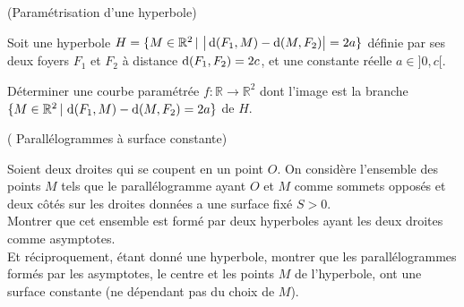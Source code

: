 \documentclass[a4paper,12pt,reqno]{amsart}
\begin{document}
\begin{exo} (Paramétrisation d'une hyperbole)


  Soit une hyperbole $H = \{ M \in \mathbb{R}^{2} \,|\ \big|\operatorname{d}(F_{1},M)-\operatorname{d}(M,F_{2})\big|=2a\}$ définie par ses deux foyers $F_{1}$ et $F_{2}$ à distance $\operatorname{d}(F_{1},F_{2})=2c$, et une constante réelle $a \in ]0,c[$.

  Déterminer une courbe paramétrée $f:\mathbb{R}\to\mathbb{R}^{2}$ dont l'image est la branche $\{ M \in \mathbb{R}^{2} \,|\, \operatorname{d}(F_{1},M)-\operatorname{d}(M,F_{2})=2a\}$ de $H$.
\end{exo}


\begin{exo} ( Parallélogrammes à surface constante)


  Soient deux droites qui se coupent en un point $O$. On considère l'ensemble des points $M$ tels que le parallélogramme ayant $O$ et $M$ comme sommets opposés et deux côtés sur les droites données a une surface fixé $S>0$.\\
  Montrer que cet ensemble est formé par deux hyperboles ayant les deux droites comme asymptotes. \\
  Et réciproquement, étant donné une hyperbole, montrer que les parallélogrammes formés par les asymptotes, le centre et les points $M$ de l'hyperbole, ont une surface constante (ne dépendant pas du choix de $M$).
\end{exo}
\end{document}
